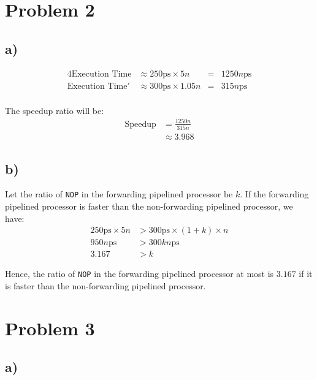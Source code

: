 \documentclass[a4paper,12pt]{article}
\begin{document}
\section*{Problem 2}

\subsection*{a)}

\begin{alignat*}{4}
	\text{Execution Time} &\approx 250 \text{ps} \times 5n &=& 1250n \text{ps} \\
	\text{Execution Time}' &\approx 300 \text{ps} \times 1.05n &=& 315n \text{ps} \\
\end{alignat*}

The speedup ratio will be:
\begin{align*}
	\text{Speedup} &= \frac{1250n}{315n} \\
	&\approx 3.968
\end{align*}

\subsection*{b)}

Let the ratio of \texttt{NOP} in the forwarding pipelined processor be $k$.
If the forwarding pipelined processor is faster than the non-forwarding pipelined processor, we have:
\begin{align*}
	250 \text{ps} \times 5n &> 300 \text{ps} \times (1 + k) \times n \\
	950n \text{ps} &> 300kn \text{ps} \\
	3.167 &> k
\end{align*}

Hence, the ratio of \texttt{NOP} in the forwarding pipelined processor at most is $3.167$ if it is faster than the non-forwarding pipelined processor.

\newpage
\section*{Problem 3}

\subsection*{a)}
\end{document}
